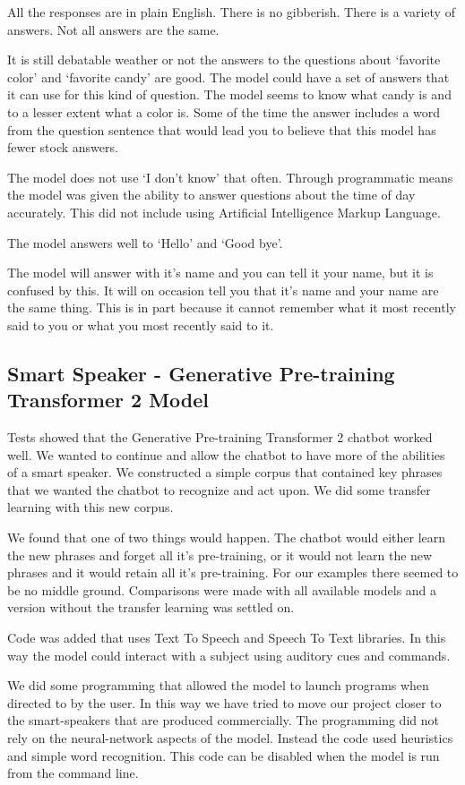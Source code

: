 All the responses are in plain English. There is no gibberish. There is a variety of answers. Not all answers are the same. 

It is still debatable weather or not the answers to the questions about `favorite color' and `favorite candy' are good. The model could have a set of answers that it can use for this kind of question. The model seems to know what candy is and to a lesser extent what a color is. Some of the time the answer includes a word from the question sentence that would lead you to believe that this model has fewer stock answers.

The model does not use `I don't know' that often. Through programmatic means the model was given the ability to answer questions about the time of day accurately. This did not include using Artificial Intelligence Markup Language. 

The model answers well to `Hello' and `Good bye'.

The model will answer with it's name and you can tell it your name, but it is confused by this. It will on occasion tell you that it's name and your name are the same thing. This is in part because it cannot remember what it most recently said to you or what you most recently said to it. 

\subsection{Smart Speaker - Generative Pre-training Transformer 2 Model}
Tests showed that the Generative Pre-training Transformer 2 chatbot worked well. We wanted to continue and allow the chatbot to have more of the abilities of a smart speaker. We constructed a simple corpus that contained key phrases that we wanted the chatbot to recognize and act upon. We did some transfer learning with this new corpus.

We found that one of two things would happen. The chatbot would either learn the new phrases and forget all it's pre-training, or it would not learn the new phrases and it would retain all it's pre-training. For our examples there seemed to be no middle ground. Comparisons were made with all available models and a version without the transfer learning was settled on.

Code was added that uses Text To Speech and Speech To Text libraries. In this way the model could interact with a subject using auditory cues and commands.

We did some programming that allowed the model to launch programs when directed to by the user. In this way we have tried to move our project closer to the smart-speakers that are produced commercially. The programming did not rely on the neural-network aspects of the model. Instead the code used heuristics and simple word recognition. This code can be disabled when the model is run from the command line.

